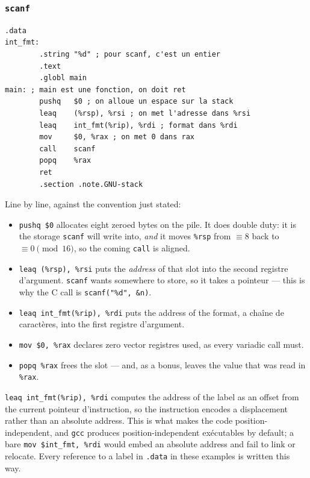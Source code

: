 \subsubsection{\texttt{scanf}}
\begin{lstlisting}[language=gas]
        .data
int_fmt:
        .string "%d" ; pour scanf, c'est un entier
        .text
        .globl main
main: ; main est une fonction, on doit ret
        pushq   $0 ; on alloue un espace sur la stack
        leaq    (%rsp), %rsi ; on met l'adresse dans %rsi
        leaq    int_fmt(%rip), %rdi ; format dans %rdi
        mov     $0, %rax ; on met 0 dans rax
        call    scanf
        popq    %rax
        ret
        .section .note.GNU-stack
\end{lstlisting}

Line by line, against the convention just stated:
\begin{itemize}
  \item \texttt{pushq \$0} allocates eight zeroed bytes on the pile. It does
    double duty: it is the storage \texttt{scanf} will write into, \emph{and} it
    moves \texttt{\%rsp} from $\equiv 8$ back to $\equiv 0 \pmod{16}$, so the
    coming \texttt{call} is aligned.
  \item \texttt{leaq (\%rsp), \%rsi} puts the \emph{address} of that slot into
    the second registre d'argument. \texttt{scanf} wants somewhere to store, so
    it takes a pointeur --- this is why the C call is \texttt{scanf("\%d", \&n)}.
  \item \texttt{leaq int\_fmt(\%rip), \%rdi} puts the address of the format, a
    chaîne de caractères, into the first registre d'argument.
  \item \texttt{mov \$0, \%rax} declares zero vector registres used, as every
    variadic call must.
  \item \texttt{popq \%rax} frees the slot --- and, as a bonus, leaves the value
    that was read in \texttt{\%rax}.
\end{itemize}

\begin{remark}
  \texttt{leaq int\_fmt(\%rip), \%rdi} computes the address of the label as an
  offset from the current pointeur d'instruction, so the instruction encodes a
  displacement rather than an absolute address. This is what makes the code
  position-independent, and \texttt{gcc} produces position-independent
  exécutables by default; a bare \texttt{mov \$int\_fmt, \%rdi} would embed an
  absolute address and fail to link or relocate. Every reference to a label in
  \texttt{.data} in these examples is written this way.
\end{remark}

